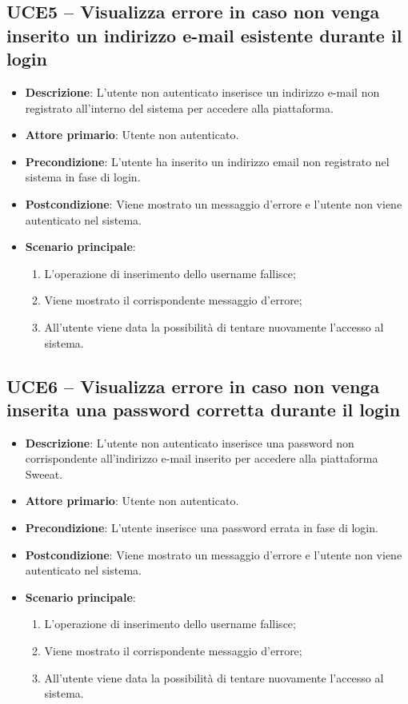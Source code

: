 \subsection{UCE5 – Visualizza errore in caso non venga inserito un indirizzo e-mail esistente durante il login}
\begin{itemize}
\item \textbf{Descrizione}: L'utente non autenticato inserisce un indirizzo e-mail non registrato all'interno del sistema per accedere alla piattaforma.
\item \textbf{Attore primario}: Utente non autenticato.
\item \textbf{Precondizione}: L'utente ha inserito un indirizzo email non registrato nel sistema in fase di login.
\item \textbf{Postcondizione}: Viene mostrato un messaggio d'errore e l'utente non viene autenticato nel sistema.

\item \textbf{Scenario principale}:
\begin{enumerate}
\item L'operazione di inserimento dello username fallisce;
\item Viene mostrato il corrispondente messaggio d'errore;
\item All'utente viene data la possibilità di tentare nuovamente l'accesso al sistema.
\end{enumerate}
\end{itemize}

\subsection{UCE6 – Visualizza errore in caso non venga inserita una password corretta durante il login}
\begin{itemize}
\item \textbf{Descrizione}: L'utente non autenticato inserisce una password non corrispondente all'indirizzo e-mail inserito per accedere alla piattaforma Sweeat.
\item \textbf{Attore primario}: Utente non autenticato.
\item \textbf{Precondizione}: L'utente inserisce una password errata in fase di login.
\item \textbf{Postcondizione}: Viene mostrato un messaggio d'errore e l'utente non viene autenticato nel sistema.

\item \textbf{Scenario principale}:
\begin{enumerate}
\item L'operazione di inserimento dello username fallisce;
\item Viene mostrato il corrispondente messaggio d'errore;
\item All'utente viene data la possibilità di tentare nuovamente l'accesso al sistema.
\end{enumerate}
\end{itemize}

